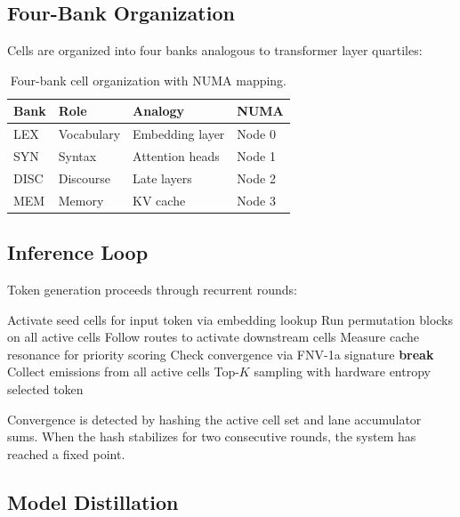 \documentclass[10pt,twocolumn]{article}
\begin{document}
\subsection{Four-Bank Organization}

Cells are organized into four banks analogous to transformer layer quartiles:

\begin{table}[h]
\centering
\small
\begin{tabular}{llll}
\toprule
\textbf{Bank} & \textbf{Role} & \textbf{Analogy} & \textbf{NUMA} \\
\midrule
LEX & Vocabulary & Embedding layer & Node 0 \\
SYN & Syntax & Attention heads & Node 1 \\
DISC & Discourse & Late layers & Node 2 \\
MEM & Memory & KV cache & Node 3 \\
\bottomrule
\end{tabular}
\caption{Four-bank cell organization with NUMA mapping.}
\label{tab:banks}
\end{table}

\subsection{Inference Loop}

Token generation proceeds through recurrent rounds:

\begin{algorithm}[h]
\caption{RPI Token Generation}
\label{alg:decode}
\begin{algorithmic}[1]
\STATE Activate seed cells for input token via embedding lookup
  \STATE Run permutation blocks on all active cells
  \STATE Follow routes to activate downstream cells
  \STATE Measure cache resonance for priority scoring
  \STATE Check convergence via FNV-1a signature
    \STATE \textbf{break}
  \ENDIF
\ENDFOR
\STATE Collect emissions from all active cells
\STATE Top-$K$ sampling with hardware entropy
\RETURN selected token
\end{algorithmic}
\end{algorithm}

Convergence is detected by hashing the active cell set and lane accumulator sums. When the hash stabilizes for two consecutive rounds, the system has reached a fixed point.

\subsection{Model Distillation}
\end{document}
